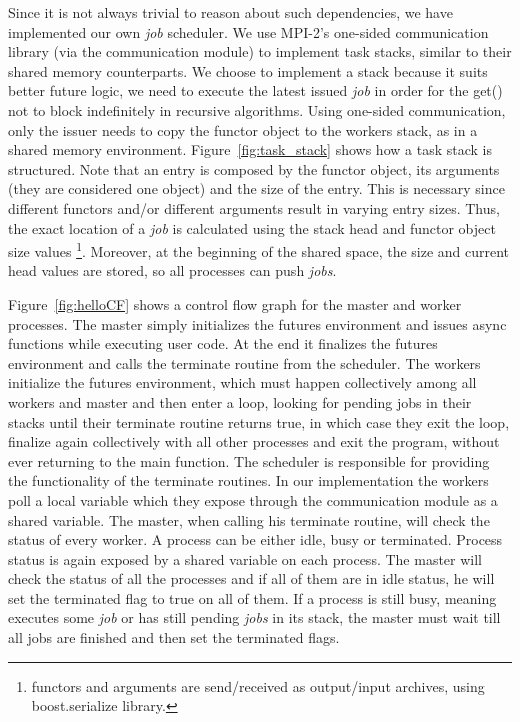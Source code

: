 Since it is not always trivial to reason about such dependencies, we have implemented our own \emph{job} 
scheduler.  We use MPI-2's one-sided communication library (via the communication module) to implement task
stacks, similar to their shared memory counterparts. We choose to implement a stack because it suits better
future logic, we need to execute the latest issued \emph{job} in order for the get() not to block indefinitely
in recursive algorithms.  Using one-sided communication, only the issuer needs to copy the functor object to
the workers stack, as in a shared memory environment.  Figure~\ref{fig:task_stack} 
shows how a task stack is structured.  
Note that an entry is composed by the functor object, its arguments (they are considered one object) and the 
size of the entry. This is necessary since different functors and/or different arguments result in 
varying entry sizes.
Thus, the exact location of a \emph{job} is calculated using the stack head and functor object size values 
\footnote{functors and arguments are send/received as output/input archives, using boost.serialize library.}.
Moreover, at the beginning of the shared space, the size and current head values are stored, so all processes
can push \emph{jobs}.


Figure~\ref{fig:helloCF} shows a control flow graph for the master and worker processes.  
The master simply initializes
the futures environment and issues async functions while executing user code.  At the end it finalizes 
the futures environment and calls the terminate routine from the scheduler.  The workers initialize 
the futures environment, which must happen collectively among all workers and master and then enter a
loop, looking for pending jobs in their stacks until their terminate routine returns true, in which case
they exit the loop, finalize again collectively with all other processes and exit the program, without ever
returning to the main function.  The scheduler is responsible for providing the functionality of the terminate
routines.  In our implementation the workers poll a local variable which they expose through the communication
module as a shared variable.  The master, when calling his terminate routine, will check the status of every 
worker.  A process can be either idle, busy or terminated.  Process status is again exposed by a shared variable
on each process.  The master will check the status of all the processes and if all of them are in idle status, he
will set the terminated flag to true on all of them.  If a process is still busy, meaning executes some \emph{job}
or has still pending \emph{jobs} in its stack, the master must wait till all jobs are finished and then set the 
terminated flags.


